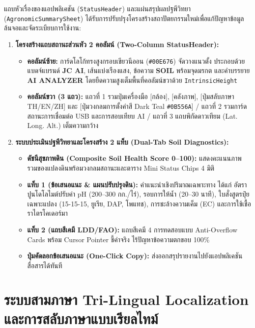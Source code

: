 แถบหัวเรื่องของแอปพลิเคชัน (\texttt{StatusHeader}) และแผ่นสรุปผลปฐพีวิทยา (\texttt{AgronomicSummarySheet}) ได้รับการปรับปรุงโครงสร้างสถาปัตยกรรมใหม่เพื่อแก้ปัญหาข้อมูลล้นจอและจัดระเบียบการใช้งาน:
\begin{enumerate}
    \item \textbf{โครงสร้างแถบสถานะส่วนหัว 2 คอลัมน์ (Two-Column StatusHeader):}
    \begin{itemize}
        \item \textbf{คอลัมน์ซ้าย:} การ์ดโลโก้ทรงสูงกรอบเขียวนีออน (\texttt{\#00E676}) จัดวางแนวตั้ง ประกอบด้วย แบดจ์แบรนด์ \textbf{JC AI}, เส้นแบ่งเรืองแสง, ข้อความ \textbf{SOIL} พร้อมจุดมรกต และคำบรรยาย \textbf{AI ANALYZER} โดยยืดความสูงเต็มพื้นที่คอลัมน์ขวาด้วย \texttt{IntrinsicHeight}
        \item \textbf{คอลัมน์ขวา (3 แถว):} แถวที่ 1 รวมปุ่มเครื่องมือ [กล้อง], [คลังภาพ], [ปุ่มสลับภาษา TH/EN/ZH] และ [ปุ่มวงกลมการตั้งค่าสี Dark Teal \texttt{\#0B556A}] / แถวที่ 2 รวมการ์ดสถานะการเชื่อมต่อ USB และการสอบเทียบ AI / แถวที่ 3 แถบพิกัดดาวเทียม (Lat. Long. Alt.) เต็มความกว้าง
    \end{itemize}
    \item \textbf{ระบบประเมินปฐพีวิทยาและโครงสร้าง 2 แท็บ (Dual-Tab Soil Diagnostics):}
    \begin{itemize}
        \item \textbf{ดัชนีสุขภาพดิน (Composite Soil Health Score 0--100):} แสดงคะแนนภาพรวมของแปลงดินพร้อมวงกลมสถานะและตาราง Mini Status Chips 4 มิติ
        \item \textbf{แท็บ 1 (ข้อเสนอแนะ \& แผนปรับปรุงดิน):} คำแนะนำเชิงปริมาณเฉพาะทาง ได้แก่ อัตราปูนโดโลไมต์ปรับค่า pH (200--300 กก./ไร่), รอบการให้น้ำ (20--30 นาที), ใบสั่งสูตรปุ๋ยเฉพาะแปลง (15-15-15, ยูเรีย, DAP, โพแทช), การชะล้างความเค็ม (EC) และการใช้เชื้อราไตรโคเดอร์มา
        \item \textbf{แท็บ 2 (แถบสีเคมี LDD/FAO):} แถบสีเคมี 4 การทดสอบแบบ Anti-Overflow Cards พร้อม Cursor Pointer ชี้ค่าจริง ไร้ปัญหาข้อความตกขอบ 100\%
        \item \textbf{ปุ่มคัดลอกข้อเสนอแนะ (One-Click Copy):} ส่งออกสรุปรายงานไปยังแอปพลิเคชันสื่อสารได้ทันที
    \end{itemize}
\end{enumerate}

\section{ระบบสามภาษา Tri-Lingual Localization และการสลับภาษาแบบเรียลไทม์}

